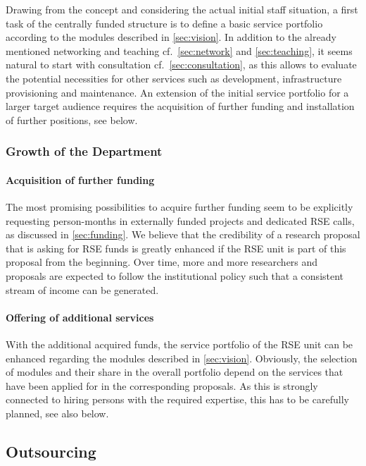 \documentclass[a4paper]{article}
\begin{document}
Drawing from the concept and considering the actual initial staff situation, a first task of the centrally funded structure is to define a basic service portfolio according to the modules described in \autoref{sec:vision}.
In addition to the already mentioned networking and teaching cf.~\autoref{sec:network} and \autoref{sec:teaching}, it seems natural to start with consultation cf.~\autoref{sec:consultation},
as this allows to evaluate the potential necessities for other services such as development, infrastructure provisioning and maintenance.
An extension of the initial service portfolio for a larger target audience requires the acquisition of further funding and installation of further positions, see below.

\subsubsection{Growth of the Department}

\paragraph{Acquisition of further funding}
The most promising possibilities to acquire further funding seem to be explicitly requesting person-months in externally funded projects and dedicated RSE calls, as discussed in \autoref{sec:funding}.
We believe that the credibility of a research proposal that is asking for RSE funds is greatly enhanced if the RSE unit is part of this proposal from the beginning.
Over time, more and more researchers and proposals are expected to follow the institutional policy such that a consistent stream of income can be generated.

\paragraph{Offering of additional services}
With the additional acquired funds, the service portfolio of the RSE unit can be enhanced regarding the modules described in \autoref{sec:vision}.
Obviously, the selection of modules and their share in the overall portfolio depend on the services that have been applied for in the corresponding proposals.
As this is strongly connected to hiring persons with the required expertise, this has to be carefully planned, see also below.


\subsection{Outsourcing}
\end{document}
